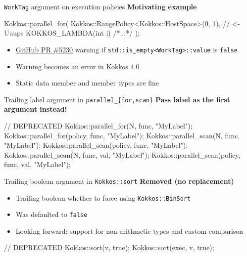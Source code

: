 \begin{frame}[fragile]{\texttt{WorkTag} argument on execution policies}
\textbf{Motivating example}
\begin{code}[keywords={HostSpace}]
Kokkos::parallel_for(
    Kokkos::RangePolicy<Kokkos::HostSpace>(0, 1), // <- Uuups
    KOKKOS_LAMBDA(int i){ /*...*/ });
\end{code}

\begin{itemize}
\item \href{https://github.com/kokkos/kokkos/pull/5230}{GitHub PR \#5230} warning if \texttt{std::is\_empty<WorkTag>::value} is \texttt{false}
\item Warning becomes an error in Kokkos 4.0
\item Static data member and member types are fine
\end{itemize}



\end{frame}


\begin{frame}[fragile]{Trailing label argument in \texttt{parallel\_\{for,scan\}}}
\textbf{Pass label as the first argument instead!}

\begin{code}
// DEPRECATED
Kokkos::parallel_for(N, func, "MyLabel");
Kokkos::parallel_for(policy, func, "MyLabel");
Kokkos::parallel_scan(N, func, "MyLabel");
Kokkos::parallel_scan(policy, func, "MyLabel");
Kokkos::parallel_scan(N, func, val, "MyLabel");
Kokkos::parallel_scan(policy, func, val, "MyLabel");
\end{code}

\end{frame}


\begin{frame}[fragile]{Trailing boolean argument in \texttt{Kokkos::sort}}
\textbf{Removed (no replacement)}
\begin{itemize}
\item Trailing boolean whether to force using \texttt{Kokkos::BinSort}
\item Was defaulted to \texttt{false}
\item Looking forward: support for non-arithmetic types and custom comparison
\end{itemize}

\begin{code}
// DEPRECATED
Kokkos::sort(v, true); 
Kokkos::sort(exec, v, true); 
\end{code}

\end{frame}

